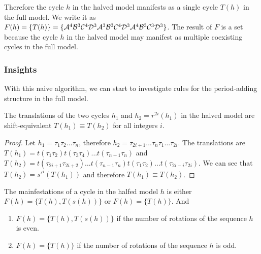 Therefore the cycle $h$ in the halved model manifests as a single cycle $T(h)$ in the full model.
We write it as $F(h) = \{T(h)\} = \{\mathcal{A}^4\mathcal{B}^3\mathcal{C}^4\mathcal{D}^3\mathcal{A}^3\mathcal{B}^3\mathcal{C}^4\mathcal{D}^3\mathcal{A}^4\mathcal{B}^3\mathcal{C}^3\mathcal{D}^3\}$.
The result of $F$ is a set because the cycle $h$ in the halved model may manifest as multiple coexisting cycles in the full model.

\subsubsection{Insights}

With this naive algorithm, we can start to investigate rules for the period-adding structure in the full model.

\begin{lemma}
	\label{lemma:equivalence.translations}
	The translations of the two cycles $h_1$ and $h_2 = r^{2i}(h_1)$ in the halved model are shift-equivalent $T(h_1) \equiv T(h_2)$ for all integers $i$.
\end{lemma}

\begin{proof}
	Let $h_1 = \tau_1\tau_2 \dots \tau_n$, therefore $h_2 = \tau_{2i+1} \dots \tau_n\tau_1 \dots \tau_{2i}$.
	The translations are $T(h_1) = t(\tau_1\tau_2)t(\tau_3\tau_4) \dots t(\tau_{n-1}\tau_n)$
	and $T(h_2) = t(\tau_{2i+1}\tau_{2i+2}) \dots t(\tau_{n-1}\tau_n)t(\tau_1\tau_2) \dots t(\tau_{2i-i}\tau_{2i})$.
	We can see that $T(h_2) = s'^i(T(h_1))$ and therefore $T(h_1) \equiv T(h_2)$.
\end{proof}

\begin{theorem}
	\label{theorem:coexistence.even}
	The mainfestations of a cycle in the halfed model $h$ is either $F(h) = \{T(h), T(s(h))\}$ or $F(h) = \{T(h)\}$.
	And \begin{enumerate}
		\item $F(h) = \{T(h), T(s(h))\}$ if the number of rotations of the sequence $h$ is even.
		\item $F(h) = \{T(h)\}$ if the number of rotations of the sequence $h$ is odd.
	\end{enumerate}
\end{theorem}

